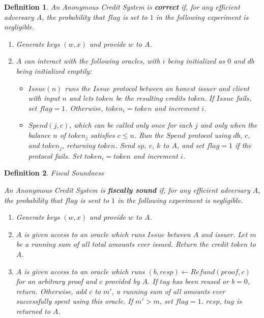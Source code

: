 \documentclass{article}
\newtheorem{definition}{Definition}
\begin{document}
\begin{definition}

An Anonymous Credit System is \textbf{correct} if, for any efficient adversary
    $A$, the probability that $flag$ is set to $1$ in the following experiment
    is negligible.

\begin{enumerate}
    \item Generate keys $(w, x)$ and provide $w$ to $A$.
    \item $A$ can interact with the following oracles, with $i$ being initialized
          as $0$ and $db$ being initialized emptily:
        \begin{itemize}

            \item $Issue(n)$ runs the $Issue$ protocol between an honest issuer
                and client with input $n$ and lets $token$ be the resulting
                credits token. If $Issue$ fails, set $flag = 1$. Otherwise,
                $token_i = token$ and increment $i$.

            \item $Spend(j, c)$, which can be called only once for each $j$ and
                only when the balance $n$ of $token_j$ satisfies $c \leq n$.
                Run the $Spend$ protocol using $db$, $c$, and $token_j$,
                returning $token$.  Send $sp$, $c$, $k$ to $A$, and set $flag =
                1$ if the protocol fails. Set $token_i = token$ and increment
                $i$.

        \end{itemize}
\end{enumerate}
\end{definition}


\begin{definition}{Fiscal Soundness}

    An Anonymous Credit System is \textbf{fiscally sound} if, for any efficient
    adversary $A$, the probability that $flag$ is sent to $1$ in the following
    experiment is negligible.

\begin{enumerate}

    \item Generate keys $(w, x)$ and provide $w$ to $A$.

    \item $A$ is given access to an oracle which runs $Issue$ between $A$ and
      issuer. Let $m$ be a running sum of all total amounts ever issued. Return
      the credit token to $A$.

    \item $A$ is given access to an oracle which runs $(b, resp) \leftarrow
      Refund(proof, c)$ for an arbitrary proof and $c$ provided by $A$. If
      $tag$ has been reused or $b = 0$, return. Otherwise, add $c$ to $m'$, a
      running sum of all amounts ever successfully spent using this oracle. If
      $m' > m$, set $flag = 1$. $resp$, $tag$ is returned to $A$.

\end{enumerate}


\end{definition}
\end{document}
